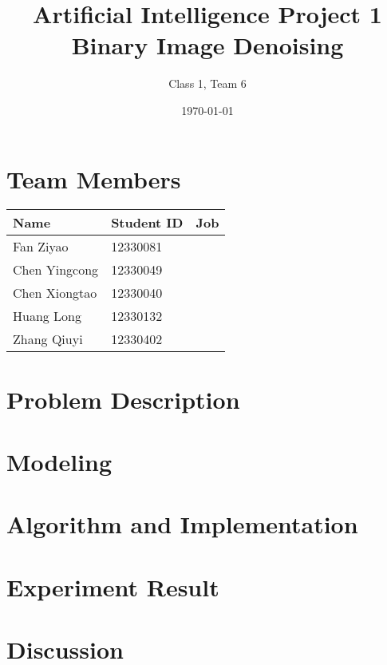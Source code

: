 \documentclass{article}
\title{}
\begin{document}


\title{
Artificial Intelligence Project 1 \\
Binary Image Denoising
}
\author{Class 1, Team 6}
\date{\today}
\maketitle

\tableofcontents
\section{Team Members}

\begin{table}[H]
\centering
\begin{tabular}{l l l}
Name & Student ID  & Job\\
\hline
Fan Ziyao & 12330081 & \\
Chen Yingcong & 12330049 & \\
Chen Xiongtao & 12330040 & \\
Huang Long & 12330132 &  \\
Zhang Qiuyi & 12330402 & 
\end{tabular}
\end{table}

\section{Problem Description}

\section{Modeling}

\section{Algorithm and Implementation}

\section{Experiment Result}

\section{Discussion}
\end{document}
